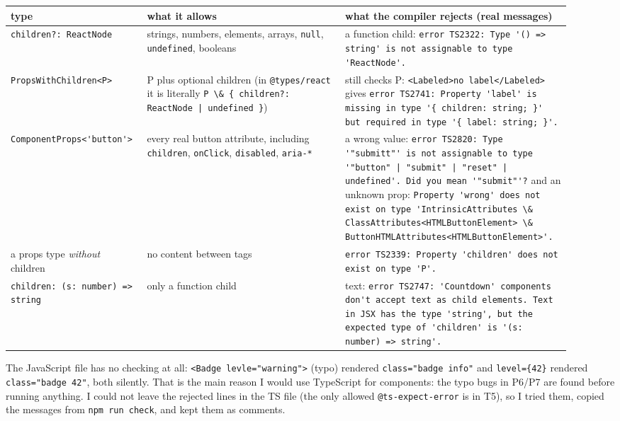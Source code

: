 {\small\begin{longtable}[]{@{}>{\raggedright\arraybackslash}p{0.21\linewidth}>{\raggedright\arraybackslash}p{0.34\linewidth}>{\raggedright\arraybackslash}p{0.37\linewidth}@{}}
\toprule\noalign{}
type & what it allows & what the compiler rejects (real messages) \\
\midrule\noalign{}
\endhead
\bottomrule\noalign{}
\endlastfoot
\passthrough{\lstinline!children?: ReactNode!} & strings, numbers, elements, arrays, \passthrough{\lstinline!null!}, \passthrough{\lstinline!undefined!}, booleans & a function child: \passthrough{\lstinline!error TS2322: Type '() => string' is not assignable to type 'ReactNode'.!} \\
\passthrough{\lstinline!PropsWithChildren<P>!} & P plus optional children (in \passthrough{\lstinline!@types/react!} it is literally \passthrough{\lstinline!P \& \{ children?: ReactNode | undefined \}!}) & still checks P: \passthrough{\lstinline!<Labeled>no label</Labeled>!} gives \passthrough{\lstinline!error TS2741: Property 'label' is missing in type '\{ children: string; \}' but required in type '\{ label: string; \}'.!} \\
\passthrough{\lstinline!ComponentProps<'button'>!} & every real button attribute, including \passthrough{\lstinline!children!}, \passthrough{\lstinline!onClick!}, \passthrough{\lstinline!disabled!}, \passthrough{\lstinline!aria-*!} & a wrong value: \passthrough{\lstinline!error TS2820: Type '"submitt"' is not assignable to type '"button" | "submit" | "reset" | undefined'. Did you mean '"submit"'?!} and an unknown prop: \passthrough{\lstinline!Property 'wrong' does not exist on type 'IntrinsicAttributes \& ClassAttributes<HTMLButtonElement> \& ButtonHTMLAttributes<HTMLButtonElement>'.!} \\
a props type \emph{without} children & no content between tags & \passthrough{\lstinline!error TS2339: Property 'children' does not exist on type 'P'.!} \\
\passthrough{\lstinline!children: (s: number) => string!} & only a function child & text: \passthrough{\lstinline!error TS2747: 'Countdown' components don't accept text as child elements. Text in JSX has the type 'string', but the expected type of 'children' is '(s: number) => string'.!} \\
\end{longtable}}

The JavaScript file has no checking at all: \passthrough{\lstinline!<Badge levle="warning">!} (typo) rendered \passthrough{\lstinline!class="badge info"!} and \passthrough{\lstinline!level=\{42\}!} rendered \passthrough{\lstinline!class="badge 42"!}, both silently. That is the main reason I would use TypeScript for components: the typo bugs in P6/P7 are found before running anything. I could not leave the rejected lines in the TS file (the only allowed \passthrough{\lstinline!@ts-expect-error!} is in T5), so I tried them, copied the messages from \passthrough{\lstinline!npm run check!}, and kept them as comments.

